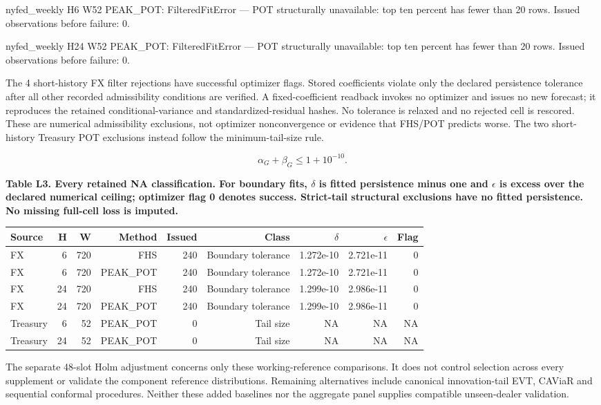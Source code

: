 \documentclass[10pt,a4paper]{article}
\begin{document}
nyfed\_weekly H6 W52 PEAK\_POT: FilteredFitError --- POT structurally unavailable: top ten percent has fewer than 20 rows. Issued observations before failure: 0.

nyfed\_weekly H24 W52 PEAK\_POT: FilteredFitError --- POT structurally unavailable: top ten percent has fewer than 20 rows. Issued observations before failure: 0.

The 4 short-history FX filter rejections have successful optimizer flags. Stored coefficients violate only the declared persistence tolerance after all other recorded admissibility conditions are verified. A fixed-coefficient readback invokes no optimizer and issues no new forecast; it reproduces the retained conditional-variance and standardized-residual hashes. No tolerance is relaxed and no rejected cell is rescored. These are numerical admissibility exclusions, not optimizer nonconvergence or evidence that FHS/POT predicts worse. The two short-history Treasury POT exclusions instead follow the minimum-tail-size rule.

\[
\alpha_G+\beta_G\le1+10^{-10}.
\]
\begin{center}
\begin{minipage}{\linewidth}
\small\textbf{Table L3. Every retained NA classification. For boundary fits, \(\delta\) is fitted persistence minus one and \(\epsilon\) is excess over the declared numerical ceiling; optimizer flag 0 denotes success. Strict-tail structural exclusions have no fitted persistence. No missing full-cell loss is imputed.}\par\medskip
\centering\fontsize{8}{10}\selectfont
\begin{tabular}{lrrrrrrrr}
\toprule
Source & H & W & Method & Issued & Class & \(\delta\) & \(\epsilon\) & Flag \\
\midrule
FX & 6 & 720 & FHS & 240 & Boundary tolerance & 1.272e-10 & 2.721e-11 & 0 \\
FX & 6 & 720 & PEAK\_POT & 240 & Boundary tolerance & 1.272e-10 & 2.721e-11 & 0 \\
FX & 24 & 720 & FHS & 240 & Boundary tolerance & 1.299e-10 & 2.986e-11 & 0 \\
FX & 24 & 720 & PEAK\_POT & 240 & Boundary tolerance & 1.299e-10 & 2.986e-11 & 0 \\
Treasury & 6 & 52 & PEAK\_POT & 0 & Tail size & NA & NA & NA \\
Treasury & 24 & 52 & PEAK\_POT & 0 & Tail size & NA & NA & NA \\
\bottomrule
\end{tabular}
\end{minipage}
\end{center}
The separate 48-slot Holm adjustment concerns only these working-reference comparisons. It does not control selection across every supplement or validate the component reference distributions. Remaining alternatives include canonical innovation-tail EVT, CAViaR and sequential conformal procedures. Neither these added baselines nor the aggregate panel supplies compatible unseen-dealer validation.
\end{document}
